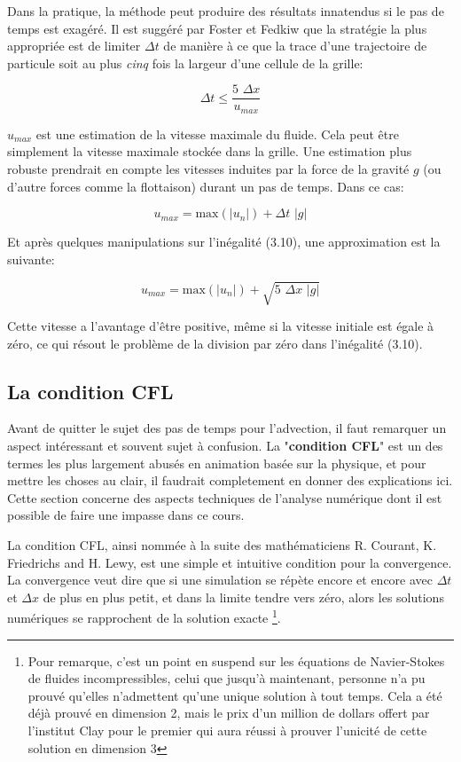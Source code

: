 \documentclass[11pt]{report}
\begin{document}
Dans la pratique, la méthode peut produire des résultats innatendus si le pas de temps est exagéré. Il est suggéré par Foster et Fedkiw \cite{foster-fedkiw-01} que la stratégie la plus appropriée est de limiter $\Delta t$ de manière à ce que la trace d'une trajectoire de particule soit au plus \textit{cinq} fois la largeur d'une cellule de la grille:

\begin{equation}
\Delta t \leq \frac{5 \,\, \Delta x}{u_{max}}
\end{equation}

$u_{max}$ est une estimation de la vitesse maximale du fluide. Cela peut être simplement la vitesse maximale stockée dans la grille. Une estimation plus robuste prendrait en compte les vitesses induites par la force de la gravité $g$ (ou d'autre forces comme la flottaison) durant un pas de temps. Dans ce cas:

\begin{equation}
u_{max} = \mbox{max}(|u_n|)+\Delta t \,\, |g|
\end{equation}

Et après quelques manipulations sur l'inégalité (3.10), une approximation est la suivante:

\begin{equation}
u_{max} = \mbox{max}(|u_n|)+ \sqrt{5 \,\, \Delta x \,\, |g|}
\end{equation}

Cette vitesse a l'avantage d'être positive, même si la vitesse initiale est égale à zéro, ce qui résout le problème de la division par zéro dans l'inégalité (3.10).

\subsection{La condition CFL}

Avant de quitter le sujet des pas de temps pour l'advection, il faut remarquer un aspect intéressant et souvent sujet à confusion. La "\textbf{condition CFL}" est un des termes les plus largement abusés en animation basée sur la physique, et pour mettre les choses au clair, il faudrait completement en donner des explications ici. Cette section concerne des aspects techniques de l'analyse numérique dont il est possible de faire une impasse dans ce cours.\newline

La condition CFL, ainsi nommée à la suite des mathématiciens R. Courant, K. Friedrichs and H. Lewy, est une simple et intuitive condition pour la convergence. La convergence veut dire que si une simulation se répète encore et encore avec $\Delta t$ et $\Delta x$ de plus en plus petit, et dans la limite tendre vers zéro, alors les solutions numériques se rapprochent de la solution exacte 
\footnote{Pour remarque, c'est un point en suspend sur les équations de Navier-Stokes de fluides incompressibles, celui que jusqu'à maintenant, personne n'a pu prouvé qu'elles n'admettent qu'une unique solution  à tout temps. Cela a été déjà prouvé en dimension 2, mais le prix d'un million de dollars offert par l'institut Clay pour le premier qui aura réussi à prouver l'unicité de cette solution en dimension 3}.\newline
\end{document}
